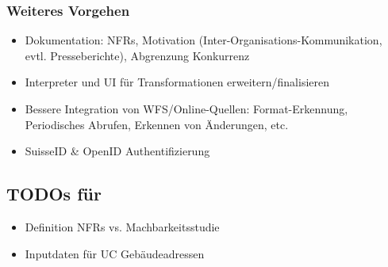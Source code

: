 \documentclass[class=scrbook,crop=false]{standalone}
\begin{document}
	\subsubsection*{Weiteres Vorgehen}
	\begin{itemize}
		\item Dokumentation: NFRs, Motivation (Inter-Organisations-Kommunikation, evtl. Presseberichte), Abgrenzung Konkurrenz
		\item Interpreter und UI für Transformationen erweitern/finalisieren
		\item Bessere Integration von WFS/Online-Quellen: Format-Erkennung, Periodisches Abrufen, Erkennen von Änderungen, etc.
		\item SuisseID \& OpenID Authentifizierung
	\end{itemize}

	\subsection*{TODOs für \prof}
	\begin{itemize}
		\item Definition NFRs vs. Machbarkeitsstudie
		\item Inputdaten für UC Gebäudeadressen
	\end{itemize}
\end{document}
